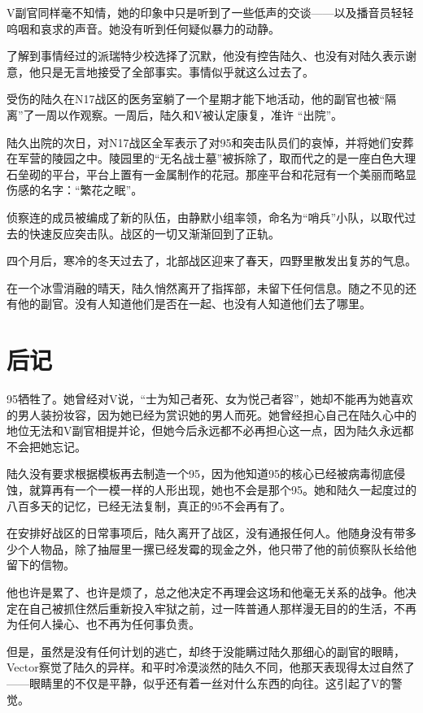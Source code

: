 V副官同样毫不知情，她的印象中只是听到了一些低声的交谈——以及播音员轻轻呜咽和哀求的声音。她没有听到任何疑似暴力的动静。

了解到事情经过的派瑞特少校选择了沉默，他没有控告陆久、也没有对陆久表示谢意，他只是无言地接受了全部事实。事情似乎就这么过去了。

受伤的陆久在N17战区的医务室躺了一个星期才能下地活动，他的副官也被“隔离”了一周以作观察。一周后，陆久和V被认定康复，准许 “出院”。

陆久出院的次日，对N17战区全军表示了对95和突击队员们的哀悼，并将她们安葬在军营的陵园之中。陵园里的“无名战士墓”被拆除了，取而代之的是一座白色大理石垒砌的平台，平台上置有一金属制作的花冠。那座平台和花冠有一个美丽而略显伤感的名字：“繁花之眠”。

侦察连的成员被编成了新的队伍，由静默小组率领，命名为“哨兵”小队，以取代过去的快速反应突击队。战区的一切又渐渐回到了正轨。

四个月后，寒冷的冬天过去了，北部战区迎来了春天，四野里散发出复苏的气息。

在一个冰雪消融的晴天，陆久悄然离开了指挥部，未留下任何信息。随之不见的还有他的副官。没有人知道他们是否在一起、也没有人知道他们去了哪里。


\section{后记}

95牺牲了。她曾经对V说，“士为知己者死、女为悦己者容”，她却不能再为她喜欢的男人装扮妆容，因为她已经为赏识她的男人而死。她曾经担心自己在陆久心中的地位无法和V副官相提并论，但她今后永远都不必再担心这一点，因为陆久永远都不会把她忘记。

陆久没有要求根据模板再去制造一个95，因为他知道95的核心已经被病毒彻底侵蚀，就算再有一个一模一样的人形出现，她也不会是那个95。她和陆久一起度过的八百多天的记忆，已经无法复制，真正的95不会再有了。

在安排好战区的日常事项后，陆久离开了战区，没有通报任何人。他随身没有带多少个人物品，除了抽屉里一摞已经发霉的现金之外，他只带了他的前侦察队长给他留下的信物。

他也许是累了、也许是烦了，总之他决定不再理会这场和他毫无关系的战争。他决定在自己被抓住然后重新投入牢狱之前，过一阵普通人那样漫无目的的生活，不再为任何人操心、也不再为任何事负责。

但是，虽然是没有任何计划的逃亡，却终于没能瞒过陆久那细心的副官的眼睛，Vector察觉了陆久的异样。和平时冷漠淡然的陆久不同，他那天表现得太过自然了——眼睛里的不仅是平静，似乎还有着一丝对什么东西的向往。这引起了V的警觉。

